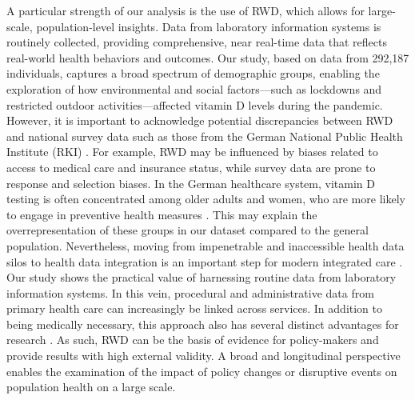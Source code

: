 \documentclass[12pt]{article}
\begin{document}
A particular strength of our analysis is the use of RWD, which allows for large-scale, population-level insights. Data from laboratory information systems is routinely collected, providing comprehensive, near real-time data that reflects real-world health behaviors and outcomes. Our study, based on data from 292,187 individuals, captures a broad spectrum of demographic groups, enabling the exploration of how environmental and social factors—such as lockdowns and restricted outdoor activities—affected vitamin D levels during the pandemic. However, it is important to acknowledge potential discrepancies between RWD and national survey data such as those from the German National Public Health Institute (RKI) \cite{rki_covid_surveys}. For example, RWD may be influenced by biases related to access to medical care and insurance status, while survey data are prone to response and selection biases. In the German healthcare system, vitamin D testing is often concentrated among older adults and women, who are more likely to engage in preventive health measures \cite{destatis_population_2024}. This may explain the overrepresentation of these groups in our dataset compared to the general population. Nevertheless, moving from impenetrable and inaccessible health data silos to health data integration is an important step for modern integrated care \cite{Schmitt2023}. Our study shows the practical value of harnessing routine data from laboratory information systems. In this vein, procedural and administrative data from primary health care can increasingly be linked across services. In addition to being medically necessary, this approach also has several distinct advantages for research \cite{Haneef2020, LeventerRoberts2017}. As such, RWD can be the basis of evidence for policy-makers and provide results with high external validity. A broad and longitudinal perspective enables the examination of the impact of policy changes or disruptive events on population health on a large scale. 
\end{document}

